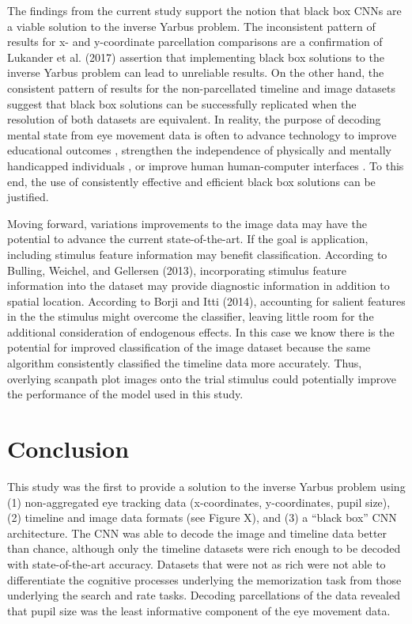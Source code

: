 \documentclass[
  english,
  man]{apa6}
\begin{document}
The findings from the current study support the notion that black box CNNs are a viable solution to the inverse Yarbus problem. The inconsistent pattern of results for x- and y-coordinate parcellation comparisons are a confirmation of Lukander et al. (2017) assertion that implementing black box solutions to the inverse Yarbus problem can lead to unreliable results. On the other hand, the consistent pattern of results for the non-parcellated timeline and image datasets suggest that black box solutions can be successfully replicated when the resolution of both datasets are equivalent. In reality, the purpose of decoding mental state from eye movement data is often to advance technology to improve educational outcomes , strengthen the independence of physically and mentally handicapped individuals , or improve human human-computer interfaces . To this end, the use of consistently effective and efficient black box solutions can be justified.

Moving forward, variations improvements to the image data may have the potential to advance the current state-of-the-art. If the goal is application, including stimulus feature information may benefit classification. According to Bulling, Weichel, and Gellersen (2013), incorporating stimulus feature information into the dataset may provide diagnostic information in addition to spatial location. According to Borji and Itti (2014), accounting for salient features in the the stimulus might overcome the classifier, leaving little room for the additional consideration of endogenous effects. In this case we know there is the potential for improved classification of the image dataset because the same algorithm consistently classified the timeline data more accurately. Thus, overlying scanpath plot images onto the trial stimulus could potentially improve the performance of the model used in this study.

\section{Conclusion}

This study was the first to provide a solution to the inverse Yarbus problem using (1) non-aggregated eye tracking data (x-coordinates, y-coordinates, pupil size), (2) timeline and image data formats (see Figure X), and (3) a \enquote{black box} CNN architecture. The CNN was able to decode the image and timeline data better than chance, although only the timeline datasets were rich enough to be decoded with state-of-the-art accuracy. Datasets that were not as rich were not able to differentiate the cognitive processes underlying the memorization task from those underlying the search and rate tasks. Decoding parcellations of the data revealed that pupil size was the least informative component of the eye movement data.
\end{document}
